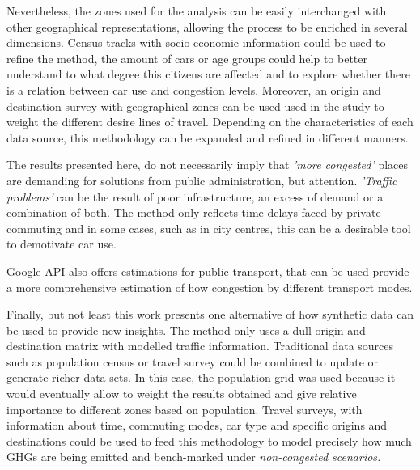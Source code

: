 \documentclass[a4paper]{jpconf}
\begin{document}
	Nevertheless, the zones used for the analysis can be easily interchanged with other geographical representations, allowing the process to be enriched in several dimensions. Census tracks with socio-economic information could be used to refine the method, the amount of cars or age groups could help to better understand to what degree this citizens are affected and to explore whether there is a relation between car use and congestion levels. Moreover, an origin and destination survey with geographical zones can be used used in the study to weight the different desire lines of travel. Depending on the characteristics of each data source, this methodology can be expanded and refined in different manners.\par
	
	The results presented here, do not necessarily imply that \textit{'more congested'} places are demanding for solutions from public administration, but attention. \textit{'Traffic problems'} can be the result of poor infrastructure, an excess of demand or a combination of both. The method only reflects time delays faced by private commuting and in some cases, such as in city centres, this can be a desirable tool to demotivate car use. \par
	
	Google API also offers estimations for public transport, that can be used provide a more comprehensive estimation of how congestion by different transport modes. \par
	
	Finally, but not least this work presents one alternative of how synthetic data can be used to provide new insights. The method only uses a dull origin and destination matrix with modelled traffic information. Traditional data sources such as population census or travel survey could be combined to update or generate richer data sets. In this case, the population grid was used because it would eventually allow to weight the results obtained and give relative importance to different zones based on population. Travel surveys, with information about time, commuting modes, car type and specific origins and destinations could be used to feed this methodology to model precisely how much GHGs are being emitted and bench-marked under \textit{non-congested scenarios.} \par
	
	
	
	
	
	
\end{document}
